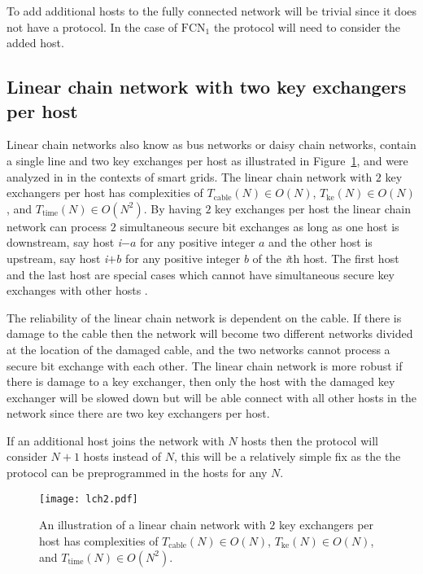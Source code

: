 \documentclass[a4paper,12pt,pdftex]{article}
\begin{document}
To add additional hosts to the fully connected network will be trivial since it does not have a protocol. In the case of $\mathrm{FCN}_{1}$ the protocol will need to consider the added host.


\subsection{Linear chain network with two key exchangers per host}

Linear chain networks also know as bus networks or daisy chain networks, contain a single line and two key exchanges per host as illustrated in Figure~\ref{fig:lch}, and were analyzed in \cite{me1} in the contexts of smart grids. The linear chain network with $2$ key exchangers per host has complexities of $T_\mathrm{cable}(N) \in O(N)$, $T_\mathrm{ke}(N) \in O(N)$, and $T_\mathrm{time}(N) \in O(N^{2})$. By having $2$ key exchanges per host the linear chain network can process $2$ simultaneous secure bit exchanges as long as one host is downstream, say host \textit{i}$-a$ for any positive integer $a$ and the other host is upstream, say host \textit{i}$+b$ for any positive integer $b$ of the \textit{i}th host. The first host and the last host are special cases which cannot have simultaneous secure key exchanges with other hosts \cite{me1}. 

The reliability of the linear chain network is dependent on the cable. If there is damage to the cable then the network will become two different networks divided at the location of the damaged cable, and the two networks cannot process a secure bit exchange with each other. The linear chain network is more robust if there is damage to a key exchanger, then only the host with the damaged key exchanger will be slowed down but will be able connect with all other hosts in the network since there are two key exchangers per host. 

If an additional host joins the network with $N$ hosts then the protocol will consider $N+1$ hosts instead of $N$, this will be a relatively simple fix as the the protocol can be preprogrammed in the hosts for any $N$.

\begin{figure}[h]
    \caption{An illustration of a linear chain network with $2$ key exchangers per host has complexities of $T_\mathrm{cable}(N) \in O(N)$, $T_\mathrm{ke}(N) \in O(N)$, and $T_\mathrm{time}(N) \in O(N^{2})$. }
    \label{fig:lch}
  \centering
\texttt{[image: lch2.pdf]}
\end{figure}
\end{document}
